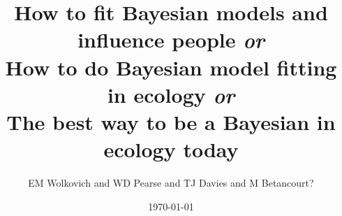 \documentclass[11pt]{article}
\begin{document}

\renewcommand{\refname}{\CHead{}}



\title{How to fit Bayesian models and influence people \emph{or}\\
How to do Bayesian model fitting in ecology \emph{or}\\
The best way to be a Bayesian in ecology today}
\date{\today}
\author{EM Wolkovich and WD Pearse and TJ Davies and M Betancourt?}
\maketitle
\end{document}
